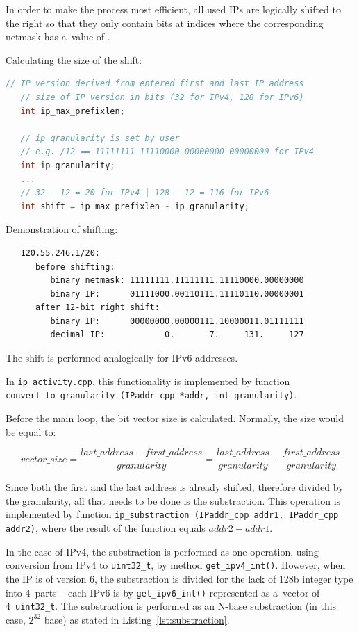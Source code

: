 In order to make the process most efficient, all used IPs are logically shifted to the right
so that they only contain bits at indices where the corresponding netmask
has a~value of .

Calculating the size of the shift:
\begin{lstlisting}[language=C++, captionpos=b, caption={Shift Size Calculation}]
   // IP version derived from entered first and last IP address
   // size of IP version in bits (32 for IPv4, 128 for IPv6)
   int ip_max_prefixlen;

   // ip_granularity is set by user
   // e.g. /12 == 11111111 11110000 00000000 00000000 for IPv4
   int ip_granularity;
   ...
   // 32 - 12 = 20 for IPv4 | 128 - 12 = 116 for IPv6
   int shift = ip_max_prefixlen - ip_granularity;
\end{lstlisting}

Demonstration of shifting:
\begin{lstlisting}
   120.55.246.1/20:
      before shifting:
         binary netmask: 11111111.11111111.11110000.00000000
         binary IP:      01111000.00110111.11110110.00000001
      after 12-bit right shift:
         binary IP:      00000000.00000111.10000011.01111111
         decimal IP:            0.       7.     131.     127
\end{lstlisting}

The shift is performed analogically for IPv6 addresses.

In \texttt{ip\_activity.cpp}, this functionality is implemented by function
\texttt{convert\_to\_granularity (IPaddr\_cpp *addr, int granularity)}.

Before the main loop, the bit vector size is calculated. Normally, the
size would be equal to:

\begin{equation}
   vector\_size = \frac{last\_address - first\_address}{granularity} = \frac{last\_address}{granularity} - \frac{first\_address}{granularity}
\end{equation}

Since both the first and the last address is already shifted, therefore divided by
the granularity, all that needs to be done is the substraction. This operation
is implemented by function \texttt{ip\_substraction (IPaddr\_cpp addr1, IPaddr\_cpp addr2)},
where the result of the function equals $addr2 - addr1$.

In the case of IPv4, the substraction is performed as one operation, using conversion
from IPv4 to \texttt{uint32\_t}, by method \texttt{get\_ipv4\_int()}.
However, when the IP is of version 6, the substraction is divided for the lack
of 128b integer type into 4~parts -- each IPv6
is by \texttt{get\_ipv6\_int()} represented as a~vector of 4~\texttt{uint32\_t}.
The substraction is performed as an N-base substraction (in this case, $2^{32}$ base)
as stated in Listing~\ref{lst:substraction}.

